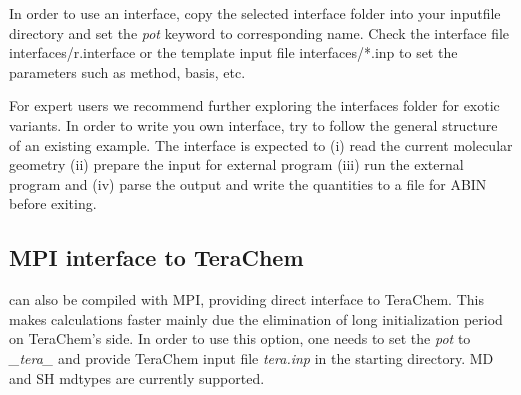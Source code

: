 In order to use an interface, copy the selected interface folder into your inputfile directory and set the \textit{pot} keyword to corresponding name. Check the interface file interfaces/r.interface or the template input file interfaces/*.inp to set the parameters such as method, basis, etc.

For expert users we recommend further exploring the interfaces folder for exotic variants. In order to write you own interface, try to follow the general structure of an existing example. The interface is expected to (i) read the current molecular geometry (ii) prepare the input for external program (iii) run the external program and (iv) parse the output and write the quantities to a file for ABIN before exiting. 


\subsection{MPI interface to TeraChem}
\abin can also be compiled with MPI, providing direct interface to TeraChem. This makes calculations faster mainly due the elimination of long initialization period on TeraChem's side. In order to use this option, one needs to set the \textit{pot} to \textit{\_tera\_} and provide TeraChem input file \textit{tera.inp} in the starting directory. MD and SH mdtypes are currently supported.




